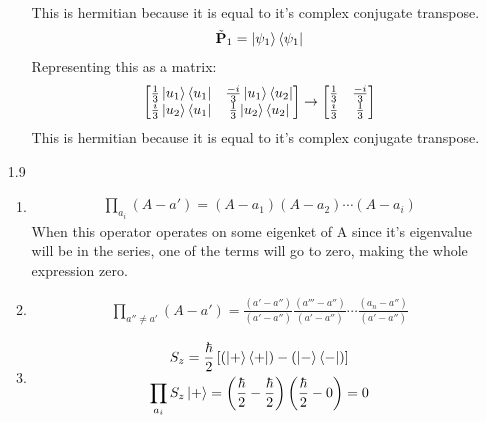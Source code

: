 \documentclass[12pt]{article}
\newcommand{\op}[1]{\tilde{\mathbf{#1}}}
\begin{document}
\begin{enumerate}
\begin{enumerate}
\begin{gather*}
            \end{gather*}
            This is hermitian because it is equal to it's complex conjugate transpose.
            \begin{gather*}
                \op{P}_1=\ket{\psi_1}\bra{\psi_1}
            \end{gather*}
            Representing this as a matrix:
            \begin{gather*}
                \begin{bmatrix}
                    \frac{1}{3}\ket{u_1}\bra{u_1} & \frac{-i}{3}\ket{u_1}\bra{u_2} \\
                    \frac{i}{3}\ket{u_2}\bra{u_1} & \frac{1}{3}\ket{u_2}\bra{u_2}
                \end{bmatrix}
                \rightarrow
                \begin{bmatrix}
                    \frac{1}{3} & \frac{-i}{3} \\
                    \frac{i}{3} & \frac{1}{3}
                \end{bmatrix}
            \end{gather*}
            This is hermitian because it is equal to it's complex conjugate transpose.
        \end{enumerate}
        \item[1.9]
        \begin{enumerate}
            \item
            \begin{gather*}
                \prod_{a_i}(A-a')=(A-a_1)(A-a_2)\cdots(A-a_i)
            \end{gather*}
            When this operator operates on some eigenket of A since it's eigenvalue will be in the series, one of the terms will go to zero, making the whole expression zero.
            \item
            \begin{gather*}
                \prod_{a''\neq a'}(A-a')=\frac{(a'-a'')}{(a'-a'')}\frac{(a'''-a'')}{(a'-a'')}\cdots\frac{(a_n-a'')}{(a'-a'')}
            \end{gather*}
            \item
            \begin{gather*}
                S_z=\frac{\hbar}{2}\left[ (\ket{+}\bra{+})-(\ket{-}\bra{-}) \right]\\
                \prod_{a_i}S_z\ket{+}=\left(\frac{\hbar}{2}-\frac{\hbar}{2}\right)\left(\frac{\hbar}{2}-0\right)=0
            \end{gather*}

\end{enumerate}
\end{enumerate}
\end{document}
